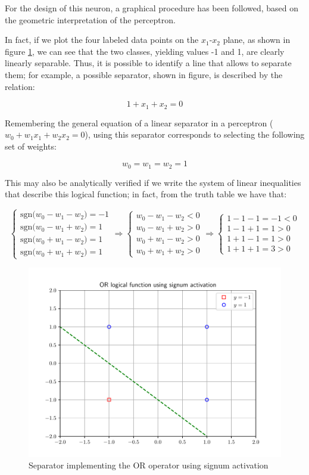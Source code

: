 \documentclass[letterpaper,headings=standardclasses]{scrartcl}
\begin{document}
For the design of this neuron, a graphical procedure has been followed, based on the geometric interpretation of the perceptron.

In fact, if we plot the four labeled data points on the $x_1$-$x_2$ plane, as shown in figure \ref{or_func}, we can see that the two classes, yielding values -1 and 1, are clearly linearly separable. Thus, it is possible to identify a line that allows to separate them; for example, a possible separator, shown in figure, is described by the relation:

$$ 1 + x_1 + x_2 = 0 $$

Remembering the general equation of a linear separator in a perceptron ($ w_0 + w_1x_1 + w_2x_2 = 0 $), using this separator corresponds to selecting the following set of weights:

$$ w_0 = w_1 = w_2 = 1 $$

This may also be analytically verified if we write the system of linear inequalities that describe this logical function; in fact, from the truth table we have that:

$$ \begin{cases} \text{sgn(} w_0 - w_1 - w_2 \text{)} = -1 \\ \text{sgn(} w_0 - w_1 + w_2 \text{)} = 1 \\ \text{sgn(} w_0 + w_1 - w_2 \text{)} = 1 \\ \text{sgn(} w_0 + w_1 + w_2 \text{)} = 1 \end{cases} \Rightarrow \begin{cases} w_0 - w_1 - w_2 < 0 \\ w_0 - w_1 + w_2 > 0 \\ w_0 + w_1 - w_2 > 0 \\ w_0 + w_1 + w_2 > 0 \end{cases} \Rightarrow \begin{cases} 1 - 1 - 1 = -1 < 0 \\ 1 - 1 + 1 = 1 > 0 \\ 1 + 1 - 1 = 1 > 0 \\ 1 + 1 + 1 = 3 > 0 \end{cases} $$

\begin{figure}[h]
\centering
\includegraphics[width=.7\linewidth]{or_func.pdf}
\caption{Separator implementing the OR operator using signum activation}
\label{or_func}
\end{figure}
\end{document}
